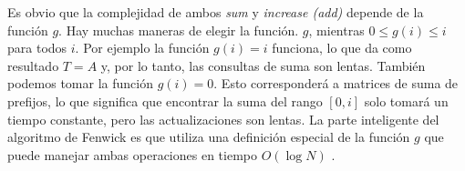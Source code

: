 Es obvio que la complejidad de ambos \emph{sum} y \emph{increase (add)} depende de la función $g$. Hay 
muchas maneras de elegir la función. $g$, mientras $0\le g(i)\le i$ para todos $i$. Por ejemplo la 
función $g(i)=i$ funciona, lo que da como resultado $T=A$ y, por lo tanto, las consultas de suma 
son lentas. También podemos tomar la función $g(i)=0$. Esto corresponderá a matrices de suma de 
prefijos, lo que significa que encontrar la suma del rango $[0,i]$ solo tomará un tiempo constante, 
pero las actualizaciones son lentas. La parte inteligente del algoritmo de Fenwick es que utiliza una 
definición especial de la función $g$ que puede manejar ambas operaciones en tiempo $O(\log N)$ .